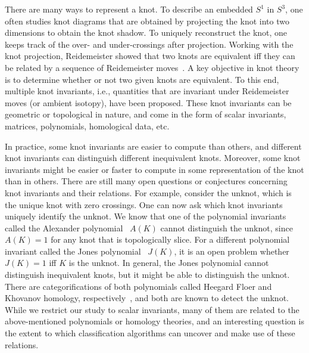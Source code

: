 \documentclass[11pt]{article}
\numberwithin{equation}{section}
\begin{document}
There are many ways to represent a knot. To describe an embedded $S^1$ in $S^3$, one often studies knot diagrams that are obtained by projecting the knot into two dimensions to obtain the knot shadow. To uniquely reconstruct the knot, one keeps track of the over- and under-crossings after projection. Working with the knot projection, Reidemeister showed that two knots are equivalent iff they can be related by a sequence of Reidemeister moves~\cite{Reidemeister:1927aaa}. A key objective in knot theory is to determine whether or not two given knots are equivalent. To this end, multiple knot invariants, i.e., quantities that are invariant under Reidemeister moves (or ambient isotopy), have been proposed. These knot invariants can be geometric or topological in nature, and come in the form of scalar invariants, matrices, polynomials, homological data, etc. 

In practice, some knot invariants are easier to compute than others, and different knot invariants can distinguish different inequivalent knots. Moreover, some knot invariants might be easier or faster to compute in some representation of the knot than in others. There are still many open questions or conjectures concerning knot invariants and their relations. For example, consider the unknot, which is the unique knot with zero crossings. One can now ask which knot invariants uniquely identify the unknot. We know that one of the polynomial invariants called the Alexander polynomial~\cite{Alexander:1928aaa} $A(K)$ cannot distinguish the unknot, since $A(K)=1$ for any knot that is topologically slice. For a different polynomial invariant called the Jones polynomial~\cite{Jones:1985aaa} $J(K)$, it is an open problem whether $J(K)=1$ iff $K$ is the unknot. In general, the Jones polynomial cannot distinguish inequivalent knots, but it might be able to distinguish the unknot. There are categorifications of both polynomials called Heegard Floer and  Khovanov homology, respectively~\cite{Ozsvath:2004aaa, Khovanov:2000aaa}, and both are known to detect the unknot. While we restrict our study to scalar invariants, many of them are related to the above-mentioned polynomials or homology theories, and an interesting question is the extent to which classification algorithms can uncover and make use of these relations.
\end{document}

